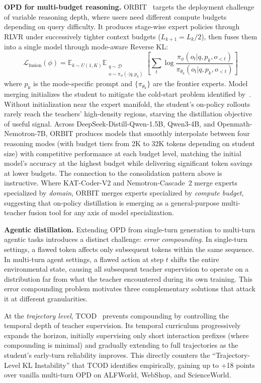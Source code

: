 \documentclass{article} %
\newcommand{\E}{\mathbb{E}}
\newcommand{\loss}{\mathcal{L}}
\begin{document}
\textbf{OPD for multi-budget reasoning.} ORBIT~\citep{liang2026orbit} targets the deployment challenge of variable reasoning depth, where users need different compute budgets depending on query difficulty. It produces stage-wise expert policies through RLVR under successively tighter context budgets ($L_{k+1} = L_k/2$), then fuses them into a single model through mode-aware Reverse KL:
\begin{equation}
    \loss_{\text{fusion}}(\phi) = \E_{k \sim U(1,K)} \E_{\substack{q \sim \mathcal{D} \\ o \sim \pi_\phi(\cdot|q, p_k)}} \left[ \sum_t \log \frac{\pi_\phi(o_t | q, p_k, o_{<t})}{\pi_{\theta_k}(o_t | q, p_k, o_{<t})} \right]
\end{equation}
where $p_k$ is the mode-specific prompt and $\{\pi_{\theta_k}\}$ are the frontier experts. Model merging initializes the student to mitigate the cold-start problem identified by~\citet{2601.07155}. Without initialization near the expert manifold, the student's on-policy rollouts rarely reach the teachers' high-density regions, starving the distillation objective of useful signal. Across DeepSeek-Distill-Qwen-1.5B, Qwen3-4B, and Openmath-Nemotron-7B, ORBIT produces models that smoothly interpolate between four reasoning modes (with budget tiers from 2K to 32K tokens depending on student size) with competitive performance at each budget level, matching the initial model's accuracy at the highest budget while delivering significant token savings at lower budgets. The connection to the consolidation pattern above is instructive. Where KAT-Coder-V2 and Nemotron-Cascade~2 merge experts specialized by \emph{domain}, ORBIT merges experts specialized by \emph{compute budget}, suggesting that on-policy distillation is emerging as a general-purpose multi-teacher fusion tool for any axis of model specialization.

\textbf{Agentic distillation.} Extending OPD from single-turn generation to multi-turn agentic tasks introduces a distinct challenge: \emph{error compounding}. In single-turn settings, a flawed token affects only subsequent tokens within the same sequence. In multi-turn agent settings, a flawed action at step $t$ shifts the entire environmental state, causing all subsequent teacher supervision to operate on a distribution far from what the teacher encountered during its own training. This error compounding problem motivates three complementary solutions that attack it at different granularities.

At the \emph{trajectory level}, TCOD~\citep{chen2026tcod} prevents compounding by controlling the temporal depth of teacher supervision. Its temporal curriculum progressively expands the horizon, initially supervising only short interaction prefixes (where compounding is minimal) and gradually extending to full trajectories as the student's early-turn reliability improves. This directly counters the ``Trajectory-Level KL Instability'' that TCOD identifies empirically, gaining up to +18 points over vanilla multi-turn OPD on ALFWorld, WebShop, and ScienceWorld.
\end{document}
